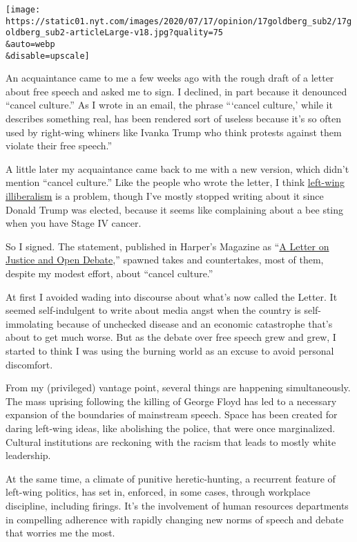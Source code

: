 \texttt{[image: https://static01.nyt.com/images/2020/07/17/opinion/17goldberg\_sub2/17goldberg\_sub2-articleLarge-v18.jpg?quality=75\\\&auto=webp\\\&disable=upscale]}

An acquaintance came to me a few weeks ago with the rough draft of a
letter about free speech and asked me to sign. I declined, in part
because it denounced ``cancel culture.'' As I wrote in an email, the
phrase ```cancel culture,' while it describes something real, has been
rendered sort of useless because it's so often used by right-wing
whiners like Ivanka Trump who think protests against them violate their
free speech.''

A little later my acquaintance came back to me with a new version, which
didn't mention ``cancel culture.'' Like the people who wrote the letter,
I think
\href{https://www.thenation.com/article/archive/cancelcolbert-and-return-anti-liberal-left/}{left-wing
illiberalism} is a problem, though I've mostly stopped writing about it
since Donald Trump was elected, because it seems like complaining about
a bee sting when you have Stage IV cancer.

So I signed. The statement, published in Harper's Magazine as
``\href{https://harpers.org/a-letter-on-justice-and-open-debate/}{A
Letter on Justice and Open Debate},'' spawned takes and countertakes,
most of them, despite my modest effort, about ``cancel culture.''

At first I avoided wading into discourse about what's now called the
Letter. It seemed self-indulgent to write about media angst when the
country is self-immolating because of unchecked disease and an economic
catastrophe that's about to get much worse. But as the debate over free
speech grew and grew, I started to think I was using the burning world
as an excuse to avoid personal discomfort.

From my (privileged) vantage point, several things are happening
simultaneously. The mass uprising following the killing of George Floyd
has led to a necessary expansion of the boundaries of mainstream speech.
Space has been created for daring left-wing ideas, like abolishing the
police, that were once marginalized. Cultural institutions are reckoning
with the racism that leads to mostly white leadership.

At the same time, a climate of punitive heretic-hunting, a recurrent
feature of left-wing politics, has set in, enforced, in some cases,
through workplace discipline, including firings. It's the involvement of
human resources departments in compelling adherence with rapidly
changing new norms of speech and debate that worries me the most.

